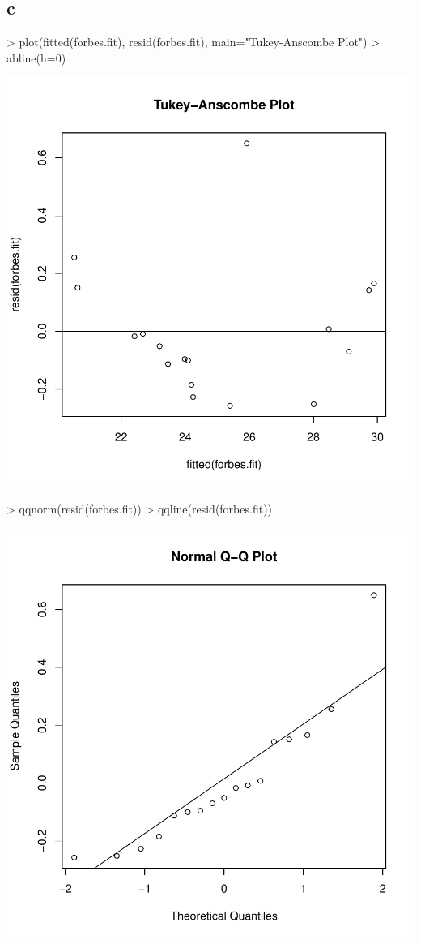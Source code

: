 \subsection{c}
\begin{Schunk}
\begin{Sinput}
> plot(fitted(forbes.fit), resid(forbes.fit), main="Tukey-Anscombe Plot")
> abline(h=0)
\end{Sinput}
\end{Schunk}
\includegraphics{sw12_1-003}
\begin{Schunk}
\begin{Sinput}
> qqnorm(resid(forbes.fit))
> qqline(resid(forbes.fit))
\end{Sinput}
\end{Schunk}
\includegraphics{sw12_1-004}

